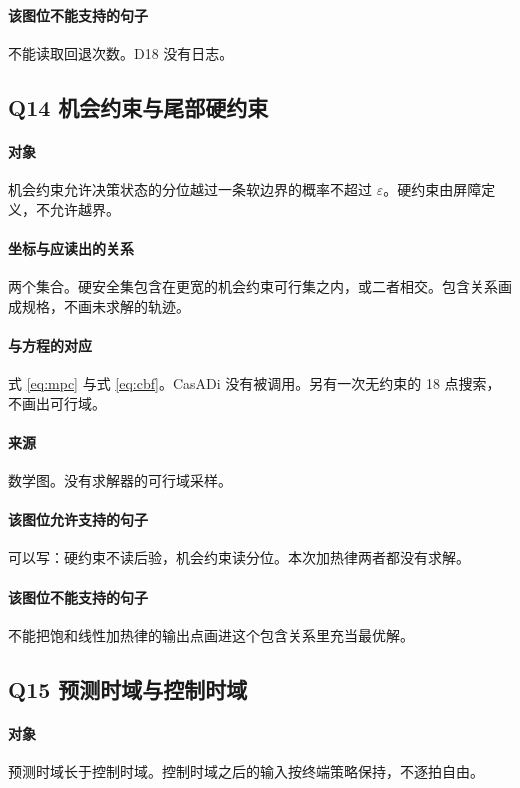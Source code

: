 \paragraph{该图位不能支持的句子}
不能读取回退次数。D18 没有日志。

\subsection{Q14 机会约束与尾部硬约束}
\paragraph{对象}
机会约束允许决策状态的分位越过一条软边界的概率不超过 $\varepsilon$。硬约束由屏障定义，不允许越界。

\paragraph{坐标与应读出的关系}
两个集合。硬安全集包含在更宽的机会约束可行集之内，或二者相交。包含关系画成规格，不画未求解的轨迹。

\paragraph{与方程的对应}
式 \eqref{eq:mpc} 与式 \eqref{eq:cbf}。CasADi 没有被调用。另有一次无约束的 18 点搜索，不画出可行域。

\paragraph{来源}
数学图。没有求解器的可行域采样。

\paragraph{该图位允许支持的句子}
可以写：硬约束不读后验，机会约束读分位。本次加热律两者都没有求解。

\paragraph{该图位不能支持的句子}
不能把饱和线性加热律的输出点画进这个包含关系里充当最优解。

\subsection{Q15 预测时域与控制时域}
\paragraph{对象}
预测时域长于控制时域。控制时域之后的输入按终端策略保持，不逐拍自由。

